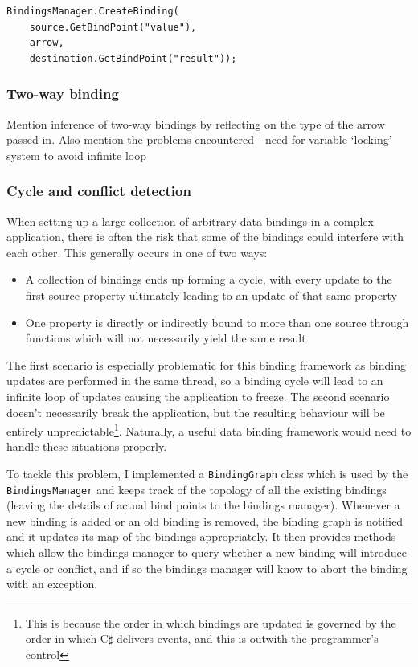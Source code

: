 \documentclass[12pt,twoside,notitlepage]{report}
\begin{document}
\begin{lstlisting}[language={[Sharp]C}, caption={Creating a binding between two properties}, label=lst:creating_simple_binding]
BindingsManager.CreateBinding(
	source.GetBindPoint("value"),
	arrow,
	destination.GetBindPoint("result"));
\end{lstlisting}

\subsubsection{Two-way binding}

Mention inference of two-way bindings by reflecting on the type of the arrow passed in. Also mention the problems encountered - need for variable ‘locking’ system to avoid infinite loop

\subsubsection{Cycle and conflict detection}

When setting up a large collection of arbitrary data bindings in a complex application, there is often the risk that some of the bindings could interfere with each other. This generally occurs in one of two ways:

\begin{itemize}
	\item A collection of bindings ends up forming a cycle, with every update to the first source property ultimately leading to an update of that same property
	\item One property is directly or indirectly bound to more than one source through functions which will not necessarily yield the same result
\end{itemize}

The first scenario is especially problematic for this binding framework as binding updates are performed in the same thread, so a binding cycle will lead to an infinite loop of updates causing the application to freeze. The second scenario doesn't necessarily break the application, but the resulting behaviour will be entirely unpredictable\footnote{This is because the order in which bindings are updated is governed by the order in which C$\sharp$ delivers events, and this is outwith the programmer's control}. Naturally, a useful data binding framework would need to handle these situations properly.

To tackle this problem, I implemented a \texttt{BindingGraph} class which is used by the \texttt{BindingsManager} and keeps track of the topology of all the existing bindings (leaving the details of actual bind points to the bindings manager). Whenever a new binding is added or an old binding is removed, the binding graph is notified and it updates its map of the bindings appropriately. It then provides methods which allow the bindings manager to query whether a new binding will introduce a cycle or conflict, and if so the bindings manager will know to abort the binding with an exception.
\end{document}
